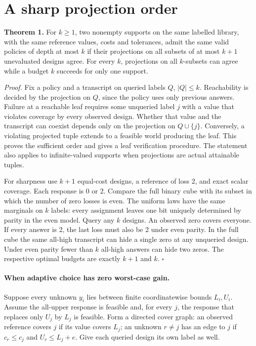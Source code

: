 \documentclass[11pt]{article}
\begin{document}
\newpage\section{A sharp projection order}
\textbf{Theorem 1.} For \(k\geq1\), two nonempty supports on the same labelled library, with the same reference values, costs and tolerances, admit the same valid policies of depth at most \(k\) if their projections on all subsets of at most \(k+1\) unevaluated designs agree. For every \(k\), projections on all \(k\)-subsets can agree while a budget \(k\) succeeds for only one support.

\emph{Proof.} Fix a policy and a transcript on queried labels \(Q\), \(|Q|\leq k\). Reachability is decided by the projection on \(Q\), since the policy uses only previous answers. Failure at a reachable leaf requires some unqueried label \(j\) with a value that violates coverage by every observed design. Whether that value and the transcript can coexist depends only on the projection on \(Q\cup\{j\}\). Conversely, a violating projected tuple extends to a feasible world producing the leaf. This proves the sufficient order and gives a leaf verification procedure. The statement also applies to infinite-valued supports when projections are actual attainable tuples.

For sharpness use \(k+1\) equal-cost designs, a reference of loss 2, and exact scalar coverage. Each response is 0 or 2. Compare the full binary cube with its subset in which the number of zero losses is even. The uniform laws have the same marginals on \(k\) labels: every assignment leaves one bit uniquely determined by parity in the even model. Query any \(k\) designs. An observed zero covers everyone. If every answer is 2, the last loss must also be 2 under even parity. In the full cube the same all-high transcript can hide a single zero at any unqueried design. Under even parity fewer than \(k\) all-high answers can hide two zeros. The respective optimal budgets are exactly \(k+1\) and \(k\). \(\square\)

\paragraph{When adaptive choice has zero worst-case gain.}
Suppose every unknown \(y_i\) lies between finite coordinatewise bounds \(L_i,U_i\). Assume the all-upper response is feasible and, for every \(j\), the response that replaces only \(U_j\) by \(L_j\) is feasible. Form a directed cover graph: an observed reference covers \(j\) if its value covers \(L_j\); an unknown \(r\ne j\) has an edge to \(j\) if \(c_r\leq c_j\) and \(U_r\leq L_j+e\). Give each queried design its own label as well.
\end{document}
